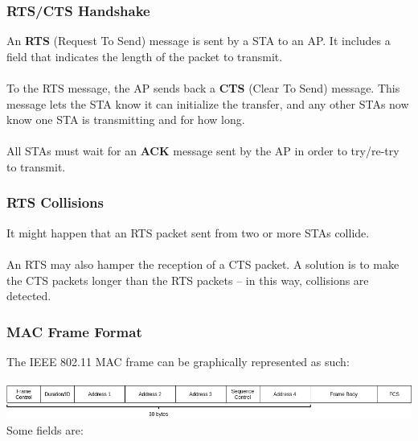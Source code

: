 \documentclass{article}
\begin{document}
\subsubsection{RTS/CTS Handshake}
An \textbf{RTS} (Request To Send) message is sent by a STA to an AP. It includes a field that indicates the length of the packet to transmit. \\ \\
To the RTS message, the AP sends back a \textbf{CTS} (Clear To Send) message. This message lets the STA know it can initialize the transfer, and any other STAs now know one STA is transmitting and for how long. \\ \\
All STAs must wait for an \textbf{ACK} message sent by the AP in order to try/re-try to transmit.

\subsubsection{RTS Collisions}
It might happen that an RTS packet sent from two or more STAs collide. \\ \\
An RTS may also hamper the reception of a CTS packet. A solution is to make the CTS packets longer than the RTS packets -- in this way, collisions are detected.

\subsubsection{MAC Frame Format}
The IEEE 802.11 MAC frame can be graphically represented as such: \\ \\

\noindent  \includegraphics[width=12.5 cm]{./assets/wifi-mac.png}
\vspace{.4cm}
Some fields are:
\end{document}
